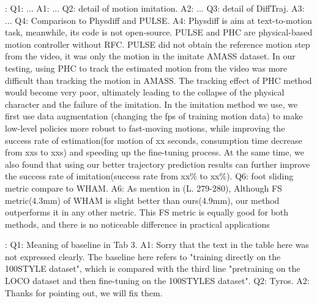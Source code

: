\noindent {}: Q1: ... A1: ... Q2: detail of motion imitation. A2: ... Q3: detail of DiffTraj. A3: ... Q4: Comparison to Physdiff and PULSE. A4: Physdiff is aim at text-to-motion task, meanwhile, its code is not open-source. PULSE and PHC are physical-based motion controller without RFC. PULSE did not obtain the reference motion step from the video, it was only the motion in the imitate AMASS dataset. In our testing, using PHC to track the estimated motion from the video was more difficult than tracking the motion in AMASS. The tracking effect of PHC method would become very poor, ultimately leading to the collapse of the physical character and the failure of the imitation. In the imitation method we use, we first use data augmentation (changing the fps of training motion data) to make low-level policies more robust to fast-moving motions, while improving the success rate of estimation(for motion of xx seconds, consumption time decrease from xxs to xxs) and speeding up the fine-tuning process. At the same time, we also found that using our better trajectory prediction results can further improve the success rate of imitation(success rate from xx\% to xx\%). Q6: foot sliding metric compare to WHAM. A6: As mention in (L. 279-280), Although FS metric(4.3mm) of WHAM is slight better than ours(4.9mm), our method outperforms it in any other metric. This FS metric is equally good for both methods, and there is no noticeable difference in practical applications


\noindent {}: Q1: Meaning of baseline in Tab 3. A1: Sorry that the text in the table here was not expressed clearly. The baseline here refers to "training directly on the 100STYLE dataset", which is compared with the third line "pretraining on the LOCO dataset and then fine-tuning on the 100STYLES dataset". Q2: Tyros. A2: Thanks for pointing out, we will fix them.
